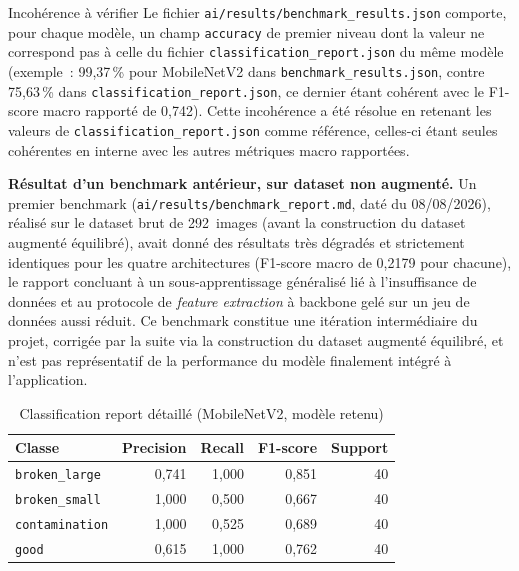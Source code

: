 \begin{noteflag}{Incoh\'erence \`a v\'erifier}
Le fichier \texttt{ai/results/benchmark\_results.json} comporte, pour chaque mod\`ele, un champ \texttt{accuracy} de premier niveau dont la valeur ne correspond pas \`a celle du fichier \texttt{classification\_report.json} du m\^eme mod\`ele (exemple~: 99,37\,\% pour MobileNetV2 dans \texttt{benchmark\_results.json}, contre 75,63\,\% dans \texttt{classification\_report.json}, ce dernier \'etant coh\'erent avec le F1-score macro rapport\'e de 0,742). Cette incoh\'erence a \'et\'e r\'esolue en retenant les valeurs de \texttt{classification\_report.json} comme r\'ef\'erence, celles-ci \'etant seules coh\'erentes en interne avec les autres m\'etriques macro rapport\'ees.
\end{noteflag}

\textbf{R\'esultat d'un benchmark ant\'erieur, sur dataset non augment\'e.} Un premier benchmark (\texttt{ai/results/benchmark\_report.md}, dat\'e du 08/08/2026), r\'ealis\'e sur le dataset brut de 292~images (avant la construction du dataset augment\'e \'equilibr\'e), avait donn\'e des r\'esultats tr\`es d\'egrad\'es et strictement identiques pour les quatre architectures (F1-score macro de 0,2179 pour chacune), le rapport concluant \`a un sous-apprentissage g\'en\'eralis\'e li\'e \`a l'insuffisance de donn\'ees et au protocole de \emph{feature extraction} \`a backbone gel\'e sur un jeu de donn\'ees aussi r\'eduit. Ce benchmark constitue une it\'eration interm\'ediaire du projet, corrig\'ee par la suite via la construction du dataset augment\'e \'equilibr\'e, et n'est pas repr\'esentatif de la performance du mod\`ele finalement int\'egr\'e \`a l'application.

\begin{table}[H]
\centering
\caption{Classification report d\'etaill\'e (MobileNetV2, mod\`ele retenu)}
\label{tab:classification-report}
\begin{tabular}{lrrrr}
\toprule
Classe & Precision & Recall & F1-score & Support \\
\midrule
\texttt{broken\_large} & 0,741 & 1,000 & 0,851 & 40 \\
\texttt{broken\_small} & 1,000 & 0,500 & 0,667 & 40 \\
\texttt{contamination} & 1,000 & 0,525 & 0,689 & 40 \\
\texttt{good} & 0,615 & 1,000 & 0,762 & 40 \\
\bottomrule
\end{tabular}
\end{table}

